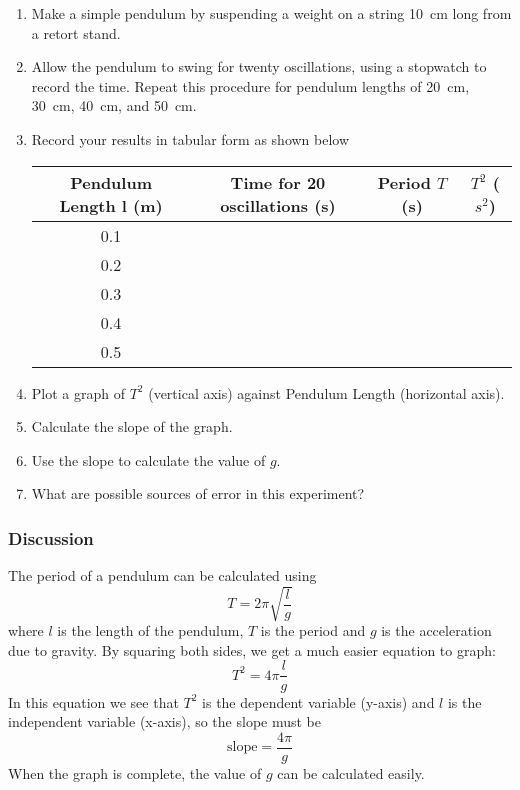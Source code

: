 \documentclass[12pt,a4paper]{report}
\begin{document}
\begin{enumerate}
\item{Make a simple pendulum by suspending a weight on a string 10~cm long from a retort
stand.}
\item{Allow the pendulum to swing for twenty oscillations, using a stopwatch to record the
time. Repeat this procedure for pendulum lengths of 20~cm, 30~cm, 40~cm, and 50~cm.}
\item{Record your results in tabular form as shown below}

\begin{center}
\begin{tabular}{ | c | c | c | c | }
\hline
Pendulum Length l (m) & Time for 20 oscillations (s) & Period $T$ (s) & $T^2$ ($s^2$) \\ \hline
0.1 & & & \\ \hline
0.2 & & & \\ \hline
0.3 & & & \\ \hline
0.4 & & & \\ \hline
0.5 & & & \\ \hline
\end{tabular}
\end{center}

\item{Plot a graph of $T^2$ (vertical axis) against Pendulum Length (horizontal axis).}
\item{Calculate the slope of the graph.}
\item{Use the slope to calculate the value of $g$.}
\item{What are possible sources of error in this experiment?}

\end{enumerate}

\subsubsection{Discussion}

The period of a pendulum can be calculated using $$T = 2\pi\sqrt{\frac{l}{g}}$$
where $l$ is the length of the pendulum, $T$ is the period and $g$ is the acceleration due to
gravity. By squaring both sides, we get a much easier equation to graph: $$T^2 = 4\pi\frac{l}{g}$$ In this equation we see that $T^2$ is the dependent variable (y-axis) and $l$ is the
independent variable (x-axis), so the slope must be $$\mathrm{slope} = \frac{4\pi}{g}$$ 
When the graph is complete, the value of $g$ can be calculated easily.
\end{document}
